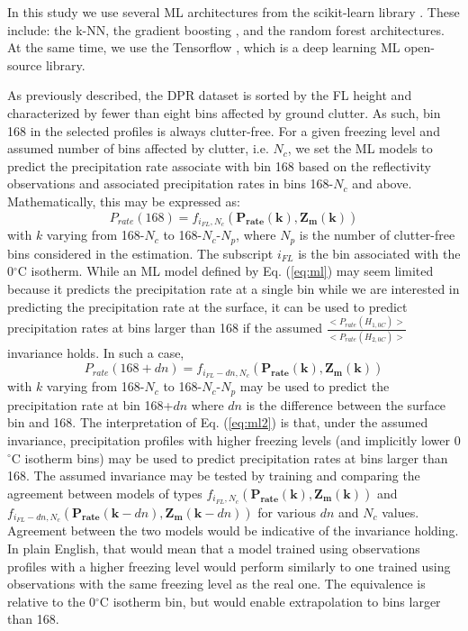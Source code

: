 \documentclass{article}
\begin{document}
In this study we use several ML architectures from the scikit-learn library 
\citep{pedregosa2011}.  These include: the k-NN, the gradient boosting
\citep{friedman2001}, and the random forest \citep{ho1995} architectures.
At the same time, we use the Tensorflow \citep{tensorflow2016}, which is a deep learning
\citep{deepL2016} ML open-source library.

As previously described, the DPR dataset is sorted by the FL height and
characterized by fewer than eight bins affected by ground clutter. As such,
bin 168 in the selected profiles is always clutter-free. For a given 
freezing level and assumed number of bins affected by clutter, i.e. $N_c$,
we set the ML models to predict the precipitation rate associate with 
bin 168 based on the reflectivity observations 
and associated precipitation rates in bins 168-$N_c$ and above.  
Mathematically, this may be expressed as:
\begin{equation}
    P_{rate}(168) = f_{i_{FL},N_c}(\mathbf{P_{rate}(k),Z_m(k)}) 
    \label{eq:ml}
\end{equation}
with $k$ varying from 168-$N_c$ to 168-$N_c$-$N_p$, where $N_p$
is the number of clutter-free bins considered in the estimation. 
The subscript $i_{FL}$ is the bin associated with the 0$^\circ$C isotherm.
While an ML model defined by Eq. (\ref{eq:ml}) may seem limited because
it predicts the precipitation rate at a single bin while we are interested
in predicting the precipitation rate at the surface, it can be used
to predict precipitation rates at bins larger than 168 if the assumed
$\frac {<P_{rate}(H_{1,0C})>} {<P_{rate}(H_{2,0C})>}$ invariance holds. 
In such a case, 
\begin{equation}
    P_{rate}(168+dn) = f_{i_{FL}-dn,N_c}(\mathbf{P_{rate}(k),Z_m(k)}) 
    \label{eq:ml2}
\end{equation}
with $k$ varying from 168-$N_c$ to 168-$N_c$-$N_p$ may be used to predict
the precipitation rate at bin 168+$dn$ where $dn$ is the difference between
the surface bin and 168. The interpretation of Eq. (\ref{eq:ml2}) is that,
under the assumed invariance, precipitation profiles with higher freezing
levels (and implicitly lower 0$^\circ$C isotherm bins) may be used
to predict precipitation rates at bins larger than 168.  The assumed 
invariance may be tested by training and comparing the agreement between
models of types $f_{i_{FL},N_c}(\mathbf{P_{rate}(k),Z_m(k)})$ and 
$f_{i_{FL}-dn,N_c}(\mathbf{P_{rate}}(\mathbf{k}-dn),\mathbf{Z_m}(\mathbf{k}-dn))$
for various $dn$ and $N_c$ values.  Agreement between the two models would
be indicative of the invariance holding. In plain English, that would mean
that a model trained using observations profiles with a higher 
freezing level would perform similarly to one trained using observations
with the same freezing level as the real one. The equivalence is
relative to the 0$^\circ$C isotherm bin,  but would enable extrapolation
to bins larger than 168. 
\end{document}
